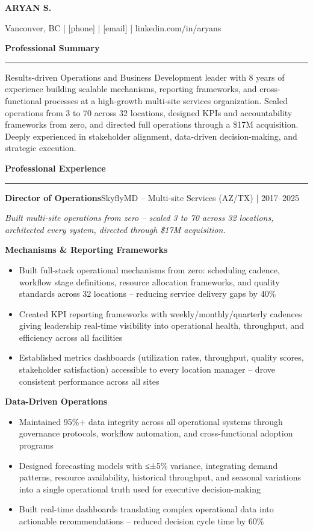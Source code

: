\documentclass[10pt,letterpaper]{article}
\newcommand{\resumename}[1]{{\centering\LARGE\textbf{#1}\par}}
\newcommand{\resumecontact}[1]{{\centering\small#1\par\vspace{6pt}}}
\newcommand{\sections}[1]{{\vspace{8pt}\textbf{\large #1}\vspace{4pt}\hrule\vspace{4pt}}}
\newcommand{\company}[2]{{\textbf{#1}\hfill#2\par}}
\begin{document}
\resumename{ARYAN S.}
\resumecontact{Vancouver, BC | [phone] | [email] | linkedin.com/in/aryans}

\sections{Professional Summary}

Results-driven Operations and Business Development leader with 8 years of experience building scalable mechanisms, reporting frameworks, and cross-functional processes at a high-growth multi-site services organization. Scaled operations from 3 to 70 across 32 locations, designed KPIs and accountability frameworks from zero, and directed full operations through a \$17M acquisition. Deeply experienced in stakeholder alignment, data-driven decision-making, and strategic execution.

\sections{Professional Experience}

\company{Director of Operations}{SkyflyMD -- Multi-site Services (AZ/TX) | 2017--2025}

\textit{Built multi-site operations from zero -- scaled 3 to 70 across 32 locations, architected every system, directed through \$17M acquisition.}

\vspace{3pt}
\textbf{Mechanisms \& Reporting Frameworks}
\begin{itemize}
  \item Built full-stack operational mechanisms from zero: scheduling cadence, workflow stage definitions, resource allocation frameworks, and quality standards across 32 locations -- reducing service delivery gaps by 40\%
  \item Created KPI reporting frameworks with weekly/monthly/quarterly cadences giving leadership real-time visibility into operational health, throughput, and efficiency across all facilities
  \item Established metrics dashboards (utilization rates, throughput, quality scores, stakeholder satisfaction) accessible to every location manager -- drove consistent performance across all sites
\end{itemize}

\textbf{Data-Driven Operations}
\begin{itemize}
  \item Maintained 95\%+ data integrity across all operational systems through governance protocols, workflow automation, and cross-functional adoption programs
  \item Designed forecasting models with ≤±5\% variance, integrating demand patterns, resource availability, historical throughput, and seasonal variations into a single operational truth used for executive decision-making
  \item Built real-time dashboards translating complex operational data into actionable recommendations -- reduced decision cycle time by 60\%
\end{itemize}
\end{document}

